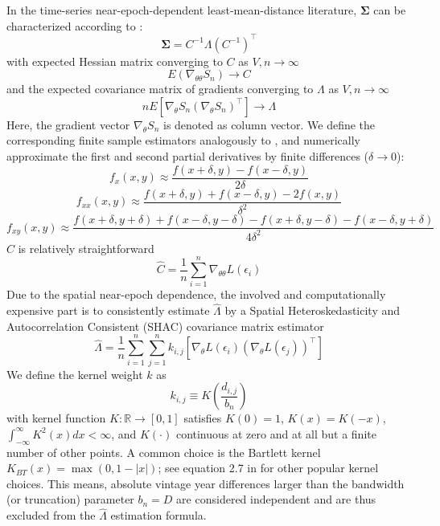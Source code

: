 \documentclass[12pt]{article}
\begin{document}
In the time-series near-epoch-dependent least-mean-distance literature, $\mathbf{\Sigma}$ can be characterized according to \citet[Theorem 11.2.b, Theorem H.1]{PP97}:
\[
\mathbf{\Sigma} = C^{-1} \Lambda (C^{-1})^\top
\]
with expected Hessian matrix converging to $C$ as $V,n \to \infty$
\[
E 
\left(
\nabla_{\theta \theta} S_n
\right)
\to C
\]
and the expected covariance matrix of gradients converging to $\Lambda$ as $V,n \to \infty$
\[
n E 
\left[
\nabla_{\theta} S_n
(\nabla_{\theta} S_n)^\top
\right]
\to \Lambda
\]
Here, the gradient vector $\nabla_{\theta} S_n$ is denoted as column vector.
We define the corresponding finite sample estimators analogously to \citet[Chapters 12, 13.1]{PP97}, and numerically approximate the first and second partial derivatives by finite differences ($\delta \to 0$): 
\[
f_{x}(x,y) \approx \frac{f(x+\delta,y) - f(x-\delta,y)}{2\delta}
\]
\[
f_{xx}(x,y) \approx \frac{f(x+\delta,y) + f(x-\delta,y) - 2  f(x,y)}{\delta^2}
\]
\[
f_{xy}(x,y) \approx \frac{f(x+\delta,y+\delta) + f(x-\delta,y-\delta) -  f(x+\delta,y-\delta) - f(x-\delta,y+\delta)}{4\delta^2}
\]
$\hat{C}$ is relatively straightforward
\[
\hat{C} = \frac{1}{n} \sum_{i=1}^n \nabla_{\theta \theta} L \left( \epsilon_i \right)
\]
Due to the spatial near-epoch dependence, the involved and computationally expensive part is to consistently estimate $\hat{\Lambda}$ by a Spatial Heteroskedasticity and Autocorrelation Consistent (SHAC) covariance matrix estimator \cite[equation 2]{KS11}
\begin{equation}
\label{eq:hac}
\hat{\Lambda} = \frac{1}{n} \sum_{i=1}^n \sum_{j=1}^n
k_{i,j}
\left[
\nabla_{\theta} L \left( \epsilon_i \right)
\left(
\nabla_{\theta} L \left( \epsilon_j \right)
\right)^\top
\right]
\end{equation}
We define the kernel weight $k$ as
\[
k_{i,j} \equiv K \left( \frac{d_{i,j}}{b_n} \right)
\]
with kernel function $K: \mathbb{R} \to [0,1]$ satisfies $K(0)=1$, $K(x)=K(-x)$, $\int_{-\infty}^{\infty} K^2(x) dx < \infty$, and $K(\cdot)$ continuous at zero and at all but a finite number of other points.
A common choice is the Bartlett kernel $K_{BT}(x)= \max(0, 1-|x|)$; see equation 2.7 in \cite{A91} for other popular kernel choices.
This means, absolute vintage year differences larger than the bandwidth (or truncation) parameter $b_n=D$ are considered independent and are thus excluded from the $\hat{\Lambda}$ estimation formula.
\end{document}
